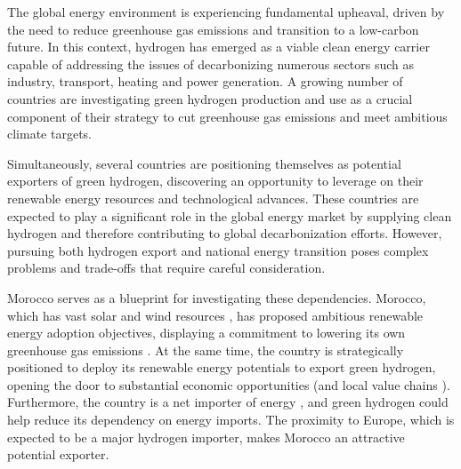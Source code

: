 The global energy environment is experiencing fundamental upheaval, driven by the need to reduce greenhouse gas emissions and transition to a low-carbon future. In this context, hydrogen has emerged as a viable clean energy carrier capable of addressing the issues of decarbonizing numerous sectors such as industry, transport, heating and power generation. A growing number of countries are investigating green hydrogen production and use as a crucial component of their strategy to cut greenhouse gas emissions and meet ambitious climate targets.


Simultaneously, several countries are positioning themselves as potential exporters of green hydrogen, discovering an opportunity to leverage on their renewable energy resources and technological advances. %
These countries are expected to play a significant role in the global energy market by supplying clean hydrogen and therefore contributing to global decarbonization efforts. However, pursuing both hydrogen export and national energy transition poses complex problems and trade-offs that require careful consideration.

Morocco serves as a blueprint for investigating these dependencies. Morocco, which has vast solar and wind resources \cite{Peters2023, Touili2018, Sterl2022}, has proposed ambitious renewable energy adoption objectives, displaying a commitment to lowering its own greenhouse gas emissions \cite{CAT2021}. At the same time, the country is strategically positioned to deploy its renewable energy potentials to export green hydrogen, opening the door to substantial economic opportunities (and local value chains \cite{Ersoy2022}). Furthermore, the country is a net importer of energy \cite{IEA2022}, and green hydrogen could help reduce its dependency on energy imports. The proximity to Europe, which is expected to be a major hydrogen importer, makes Morocco an attractive potential exporter. %

